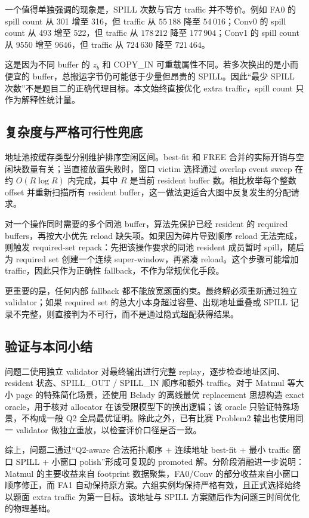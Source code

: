 一个值得单独强调的现象是，SPILL 次数与官方 traffic 并不等价。例如 FA0 的 spill count 从 301 增至 316，但 traffic 从 $55\,188$ 降至 $54\,016$；Conv0 的 spill count 从 493 增至 522，但 traffic 从 $178\,212$ 降至 $177\,904$；Conv1 的 spill count 从 9550 增至 9646，但 traffic 从 $724\,630$ 降至 $721\,464$。

这是因为不同 buffer 的 $z_b$ 和 COPY\_IN 可重载属性不同。若多次换出的是小而便宜的 buffer，总搬运字节仍可能低于少量但昂贵的 SPILL。因此“最少 SPILL 次数”不是题目二的正确代理目标。本文始终直接优化 extra traffic，spill count 只作为解释性统计量。

\subsection{复杂度与严格可行性兜底}

地址池按缓存类型分别维护排序空闲区间。best-fit 和 FREE 合并的实际开销与空闲块数量有关；当直接放置失败时，窗口 victim 选择通过 overlap event sweep 在约 $O(R\log R)$ 内完成，其中 $R$ 是当前 resident buffer 数。相比枚举每个整数 offset 并重新扫描所有 resident buffer，这一做法更适合大图中反复发生的分配请求。

对一个操作同时需要的多个同池 buffer，算法先保护已经 resident 的 required buffers，再按大小优先 reload 缺失项。如果因为碎片导致顺序 reload 无法完成，则触发 required-set repack：先把该操作要求的同池 resident 成员暂时 spill，随后为 required set 创建一个连续 super-window，再紧凑 reload。这个步骤可能增加 traffic，因此只作为正确性 fallback，不作为常规优化手段。

更重要的是，任何内部 fallback 都不能放宽题面约束。最终解必须重新通过独立 validator；如果 required set 的总大小本身超过容量、出现地址重叠或 SPILL 记录不完整，则直接判为不可行，而不是通过隐式超配获得结果。

\subsection{验证与本问小结}

问题二使用独立 validator 对最终输出进行完整 replay，逐步检查地址区间、resident 状态、SPILL\_OUT / SPILL\_IN 顺序和额外 traffic。对于 Matmul 等大小 page 的特殊简化场景，还使用 Belady 的离线最优 replacement 思想构造 exact oracle\cite{belady1966replacement}，用于核对 allocator 在该受限模型下的换出逻辑；该 oracle 只验证特殊场景，不构成一般 Q2 全局最优证明。除此之外，已有比赛 Problem2 输出也使用同一 validator 做独立重放，以检查评价口径是否一致。

综上，问题二通过“Q2-aware 合法拓扑顺序 + 连续地址 best-fit + 最小 traffic 窗口 SPILL + 小窗口 polish”形成可复现的 promoted 解。分阶段消融进一步说明：Matmul 的主要收益来自 footprint 数据聚集，FA0/Conv 的部分收益来自小窗口顺序修正，而 FA1 自动保持原方案。六组实例均保持严格有效，且正式选择始终以题面 extra traffic 为第一目标。该地址与 SPILL 方案随后作为问题三时间优化的物理基础。
